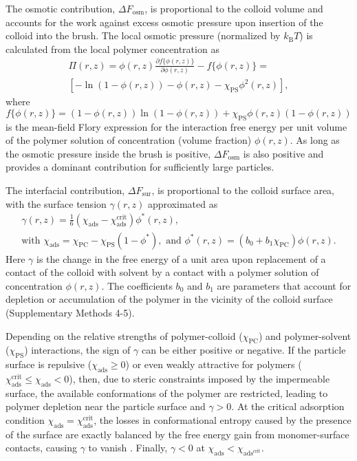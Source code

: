 \documentclass[12pt, a4paper]{article}
\begin{document}
The osmotic contribution, $\Delta F_{\text{osm}}$, is proportional to the colloid volume and accounts for the work against excess osmotic pressure upon insertion of the colloid into the brush.
The local osmotic pressure (normalized by $k_\text{B} T$) is calculated from the local polymer concentration as
\begin{equation}
    \begin{aligned}
        \Pi(r,z)=  \phi(r,z)\frac{\partial f\{\phi(r,z)\}}{\partial \phi(r,z)} - f\{\phi(r,z)\}= 
        \\
        [-\ln(1-\phi(r,z)) - \phi(r,z) -\chi_{\text{PS}}\phi^2(r,z)],
    \end{aligned}
    \label{eq:osmotic}
\end{equation}
where 
$$
f\{\phi(r,z)\}=(1-\phi(r,z))\ln(1-\phi(r,z)) +\chi_{\text{PS}}\phi(r,z)(1-\phi(r,z))
$$
is the mean-field Flory expression for the interaction free energy per unit volume of the polymer solution of concentration (volume fraction) $\phi(r,z)$.
As long as the osmotic pressure inside the brush is positive, $\Delta F_{\text{osm}}$ is also positive and provides a dominant contribution for sufficiently large particles.

The interfacial contribution, $\Delta F_{\text{sur}}$, is proportional to the colloid surface area, with the surface tension $\gamma (r,z)$ approximated as
\begin{gather}
     \gamma (r,z)= \frac{1}{6}(\chi_{\text{ads}} - \chi_{\text{ads}}^{\text{crit}})\phi^{\ast}(r,z),
    \label{eq:chi_ads} 
    \\
    \text{with } \chi_{\text{ads}} = \chi_{\text{PC}} - \chi_{\text{PS}}(1-\phi^{\ast}), \text{ and } \phi^{\ast}(r,z)= (b_{0} + b_{1}\chi_{\text{PC}})\phi(r,z).
    \nonumber
\end{gather}
Here $\gamma$ is the change in the free energy of a unit area upon replacement of a contact of the colloid with solvent by a contact with a polymer solution of concentration $\phi(r,z)$.
The coefficients $b_0$ and $b_1$ are parameters that account for depletion or accumulation of the polymer in the vicinity of the colloid surface (Supplementary Methods 4-5).

Depending on the relative strengths of polymer-colloid ($\chi_{\text{PC}}$) and polymer-solvent ($\chi_{\text{PS}}$) interactions, the sign of $\gamma$ can be either positive or negative.
If the particle surface is repulsive ($\chi_{\text{ads}} \geq 0$) or even weakly attractive for polymers ($\chi_{\text{ads}}^{\text{crit}} \leq \chi_{\text{ads}} < 0$), then, due to steric constraints imposed by the impermeable surface, the available conformations of the polymer are restricted, leading to polymer depletion near the particle surface and $\gamma > 0$.
At the critical adsorption condition $\chi_{\text{ads}} = \chi_{\text{ads}}^{\text{crit}}$, the losses in conformational entropy caused by the presence of the surface are exactly balanced by the free energy gain from monomer-surface contacts, causing $\gamma$ to vanish \cite{Fleer1993,Birshtein1979,Birshtein1983,Eisenriegler1982}.
Finally, $\gamma < 0$ at $\chi_{\text{ads}} < \chi_{\text{ads}^{\text{crit}}}$.
\end{document}

